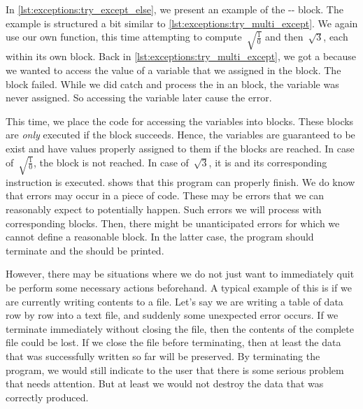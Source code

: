 %
In \cref{lst:exceptions:try_except_else}, we present an example of the -- block.
The example is structured a bit similar to \cref{lst:exceptions:try_multi_except}.
We again use our own  function, this time attempting to compute~$\sqrt{\frac{1}{0}}$ and then~$\sqrt{3}$, each within its own block.
Back in \cref{lst:exceptions:try_multi_except}, we got a  because we wanted to access the value of a variable that we assigned in the  block.
The  block failed.
While we did catch and process the  in an  block, the variable was never assigned.
So accessing the variable later cause the error.

This time, we place the code for accessing the variables into  blocks.
These blocks are \emph{only} executed if the  block succeeds.
Hence, the variables are guaranteed to be exist and have values properly assigned to them if the  blocks are reached.
In case of~$\sqrt{\frac{1}{0}}$, the  block is not reached.
In case of~$\sqrt{3}$, it is and its corresponding  instruction is executed.
 shows that this program can properly finish.%
%
\endhsection%
%
%
\label{sec:tryFinally}%
%
We do know that errors may occur in a piece of code.
These may be errors that we can reasonably expect to potentially happen.
Such errors we will process with corresponding  blocks.
Then, there might be unanticipated errors for which we cannot define a reasonable  block.
In the latter case, the program should terminate and the  should be printed.

However, there may be situations where we do not just want to immediately quit be perform some necessary actions beforehand.
A typical example of this is if we are currently writing contents to a file.
Let's say we are writing a table of data row by row into a text file, and suddenly some unexpected error occurs.
If we terminate immediately without closing the file, then the contents of the complete file could be lost.
If we close the file before terminating, then at least the data that was successfully written so far will be preserved.
By terminating the program, we would still indicate to the user that there is some serious problem that needs attention.
But at least we would not destroy the data that was correctly produced.


